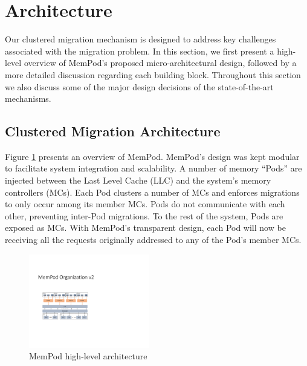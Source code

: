 \section{Architecture}
\label{sec:Architecture}

Our clustered migration mechanism is designed to address key challenges associated with the migration problem. In this section, we first present a high-level overview of MemPod's proposed micro-architectural design, followed by a more detailed discussion regarding each building block. Throughout this section we also discuss some of the major design decisions of the state-of-the-art mechanisms.


\subsection{Clustered Migration Architecture}

 Figure \ref{fig:architecture_complete} presents an overview of MemPod. MemPod's design was kept modular to facilitate system integration and scalability. A number of memory ``Pods'' are injected between the Last Level Cache (LLC) and the system's memory controllers (MCs). Each Pod clusters a number of MCs and enforces migrations to only occur among its member MCs. Pods do not communicate with each other, preventing inter-Pod migrations. To the rest of the system, Pods are exposed as MCs. With MemPod's transparent design, each Pod will now be receiving all the requests originally addressed to any of the Pod's member MCs. 
 
\begin{figure}[h]
 \includegraphics[width=0.47\textwidth]{figures/mempod_org.pdf}
 \caption{MemPod high-level architecture}
 \label{fig:architecture_complete}
\end{figure}

